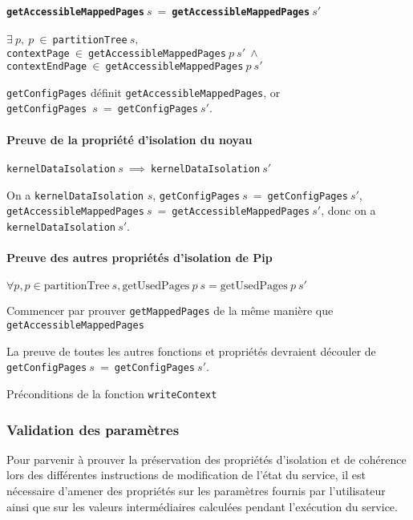 			\paragraph{\texttt{getAccessibleMappedPages}$~s~=~$\texttt{getAccessibleMappedPages}$~s'$}$ $\\
			$\exists~p,~p~\in~$\texttt{partitionTree}$~s,$\\
			\texttt{contextPage}$~\in~$\texttt{getAccessibleMappedPages}$~p~s'~\wedge$\\
			\texttt{contextEndPage}$~\in~$\texttt{getAccessibleMappedPages}$~p~s'$

			
			\texttt{getConfigPages} définit \texttt{getAccessibleMappedPages}, or\\ \texttt{getConfigPages}~$s~=~$\texttt{getConfigPages}$~s'$.

			\paragraph{Preuve de la propriété d'isolation du noyau}$ $\\
			\texttt{kernelDataIsolation}$~s~\implies~$\texttt{kernelDataIsolation}$~s'$

			On a \texttt{kernelDataIsolation} $s$, \texttt{getConfigPages}$~s~=~$\texttt{getConfigPages}$~s'$, \texttt{getAccessibleMappedPages}$~s~=~$\texttt{getAccessibleMappedPages}$~s'$, donc on a \texttt{kernelDataIsolation}$~s'$.

			\paragraph{Preuve des autres propriétés d'isolation de Pip}$ $\\
			$\forall p, p \in \text{partitionTree}~s, \text{getUsedPages}~p~s = \text{getUsedPages}~p~s'$

			Commencer par prouver \texttt{getMappedPages} de la même manière que \texttt{getAccessibleMappedPages}

			La preuve de toutes les autres fonctions et propriétés devraient découler de \texttt{getConfigPages}$~s~=~$\texttt{getConfigPages}$~s'$.

			\begin{listing}[!ht]
				\caption{Préconditions de la fonction \texttt{writeContext}}
				\label{code:writeContextPreconditions}
			\end{listing}


			\subsubsection{Validation des paramètres}
			Pour parvenir à prouver la préservation des propriétés d'isolation et de cohérence lors des différentes instructions de modification de l'état du service, il est nécessaire d'amener des propriétés sur les paramètres fournis par l'utilisateur ainsi que sur les valeurs intermédiaires calculées pendant l'exécution du service.


